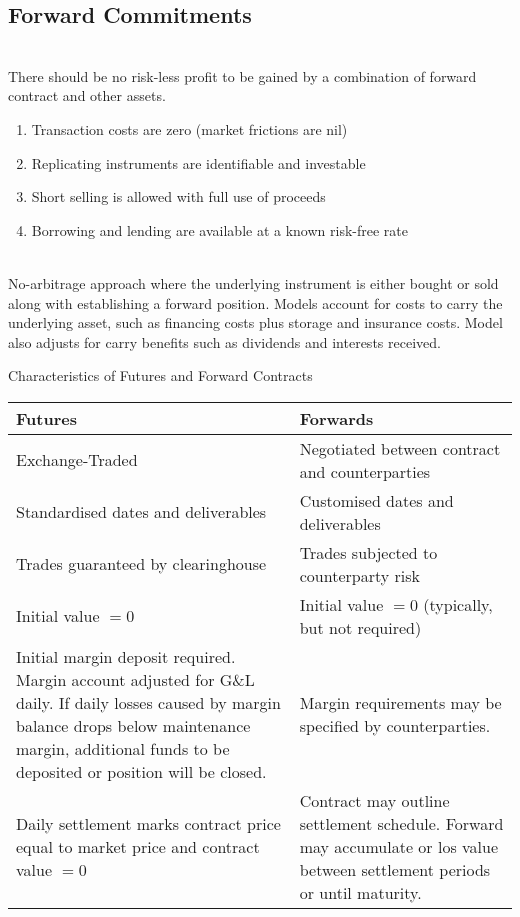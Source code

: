 \subsection{Forward Commitments}

\begin{remark} \\
There should be no risk-less profit to be gained by a combination of forward contract and other assets.
\begin{enumerate}[label=\roman*.]
\setlength{\itemsep}{0pt}
\item Transaction costs are zero (market frictions are nil)
\item Replicating instruments are identifiable and investable
\item Short selling is allowed with full use of proceeds
\item Borrowing and lending are available at a known risk-free rate
\end{enumerate}
\end{remark}

\begin{remark} \\
No-arbitrage approach where the underlying instrument is either bought or sold along with establishing a forward position. Models account for costs to carry the underlying asset, such as financing costs plus storage and insurance costs. Model also adjusts for carry benefits such as dividends and interests received.
\end{remark}

\begin{flushleft}
Characteristics of Futures and Forward Contracts
\begin{tabularx}{\textwidth}{X|X}
\hline
\rowcolor{gray!30}
Futures & Forwards \\
\hline
Exchange-Traded & Negotiated between contract and counterparties\\
\hline
Standardised dates and deliverables & Customised dates and deliverables\\
\hline
Trades guaranteed by clearinghouse & Trades subjected to counterparty risk\\
\hline
Initial value $=0$ & Initial value $=0$ (typically, but not required)\\
\hline
Initial margin deposit required. Margin account adjusted for G\&L daily. If daily losses caused by margin balance drops below maintenance margin, additional funds to be deposited or position will be closed.
&
Margin requirements may be specified by counterparties.\\
\hline
Daily settlement marks contract price equal to market price and contract value $=0$ &
Contract may outline settlement schedule. Forward may accumulate or los value between settlement periods or until maturity.\\
\hline
\end{tabularx}
\end{flushleft}

